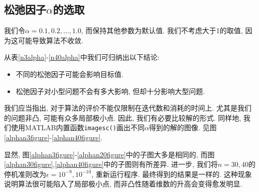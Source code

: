 \subsection{松弛因子$\alpha$的选取}
我们令$\alpha=0.1,0.2,\ldots,1.0$, 而保持其他参数为默认值. 我们不考虑大于1的取值, 因为这可能导致算法不收敛. 
\par 从表\ref{n3alpha}-\ref{n40alpha}中我们可归纳出以下结论:
\begin{itemize}
\item 不同的松弛因子可能会影响目标值.
\item 松弛因子对小型问题不会有多大影响, 但却十分影响大型问题.
\end{itemize}
\par 我们应当指出, 对于算法的评价不能仅限制在迭代数和消耗的时间上. 尤其是我们的问题非凸, 可能有众多局部极小点. 因此, 我们有必要比较解的形式. 同样地, 我们使用MATLAB内置函数\texttt{imagesc()}画出不同$\alpha$得到的解的图像. 见图\ref{alphan3figure}-\ref{alphan40figure}.
\par 显然, 图\ref{alphan3figure}-\ref{alphan20figure}中的子图大多是相同的, 而图\ref{alphan30figure},\ref{alphan40figure}中的子图则有所差异. 进一步, 我们将$n=30,40$的停机准则改为$\epsilon=10^{-9},10^{-10}$, 重新运行程序. 最终得到的结果是一样的. 这种现象说明算法很可能陷入了局部极小点, 而非凸性随着维数的升高会变得愈发明显. 

